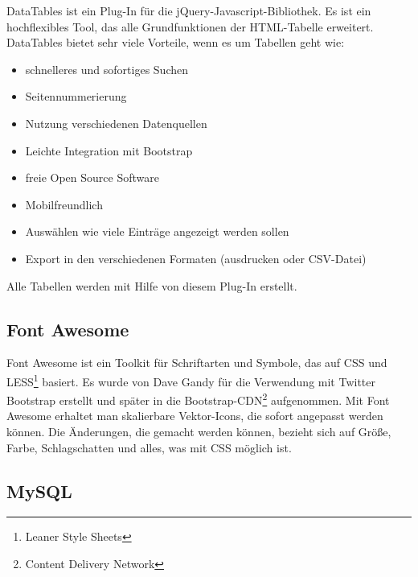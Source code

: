 DataTables ist ein Plug-In f\"{u}r die jQuery-Javascript-Bibliothek. Es ist ein hochflexibles Tool, das alle Grundfunktionen der HTML-Tabelle erweitert. DataTables bietet sehr viele Vorteile, wenn es um Tabellen geht wie: 
\begin{itemize}
	\item schnelleres und sofortiges Suchen
	\item Seitennummerierung
	\item Nutzung verschiedenen Datenquellen
	\item Leichte Integration mit Bootstrap
	\item freie Open Source Software 
	\item Mobilfreundlich
	\item Auswählen wie viele Einträge angezeigt werden sollen 
	\item Export in den verschiedenen Formaten (ausdrucken oder CSV-Datei)
\end{itemize}

Alle Tabellen werden mit Hilfe von diesem Plug-In erstellt. \cite{40_datatables}



\subsection{Font Awesome}
Font Awesome ist ein Toolkit für Schriftarten und Symbole, das auf CSS und LESS\footnote{Leaner Style Sheets} basiert. Es wurde von Dave Gandy für die Verwendung mit Twitter Bootstrap erstellt und später in die Bootstrap-CDN\footnote{Content Delivery Network} aufgenommen. Mit Font Awesome erhaltet man skalierbare Vektor-Icons, die sofort angepasst werden können. Die Änderungen, die gemacht werden können, bezieht sich auf Größe, Farbe, Schlagschatten und alles, was mit CSS möglich ist. \cite{40_fontawesome}



\subsection{MySQL}

